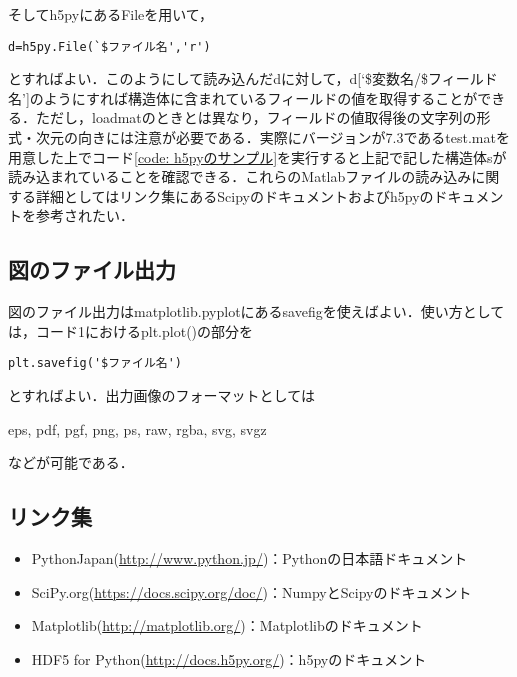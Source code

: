 	そしてh5pyにあるFileを用いて，
\begin{lstlisting}[style=python]
d=h5py.File(`$ファイル名','r')
\end{lstlisting}
	とすればよい．このようにして読み込んだdに対して，d[`\$変数名/\$フィールド名']のようにすれば構造体に含まれているフィールドの値を取得することができる．ただし，loadmatのときとは異なり，フィールドの値取得後の文字列の形式・次元の向きには注意が必要である．実際にバージョンが7.3であるtest.matを用意した上でコード\ref{code: h5pyのサンプル}を実行すると上記で記した構造体sが読み込まれていることを確認できる．これらのMatlabファイルの読み込みに関する詳細としてはリンク集にあるScipyのドキュメントおよびh5pyのドキュメントを参考されたい．
	
\subsection{図のファイル出力}
	図のファイル出力はmatplotlib.pyplotにあるsavefigを使えばよい．使い方としては，コード1におけるplt.plot()の部分を
\begin{lstlisting}[style=python]
plt.savefig('$ファイル名')
\end{lstlisting}
	とすればよい．出力画像のフォーマットとしては
	\begin{center}
		eps, pdf, pgf, png, ps, raw, rgba, svg, svgz
	\end{center}
	などが可能である．
\subsection{リンク集}
	\begin{itemize}
		\item PythonJapan(\url{http://www.python.jp/})：Pythonの日本語ドキュメント
		\item SciPy.org(\url{https://docs.scipy.org/doc/})：NumpyとScipyのドキュメント
		\item Matplotlib(\url{http://matplotlib.org/})：Matplotlibのドキュメント
		\item HDF5 for Python(\url{http://docs.h5py.org/})：h5pyのドキュメント
	\end{itemize}



